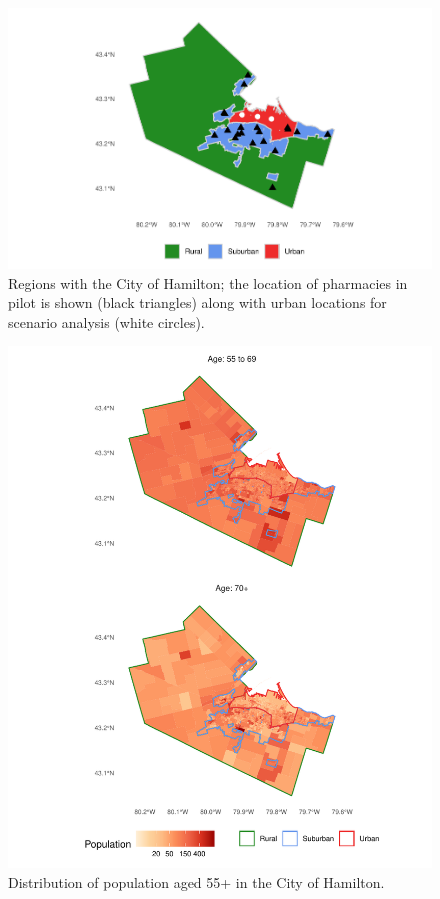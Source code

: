 \documentclass[]{elsarticle} %
\begin{document}
\begin{figure}

{\centering \includegraphics{Accessibility-Vaccination-Sites-Hamilton_files/figure-latex/pharmacies-map-1} 

}

\caption{\label{fig:pharmacies-and-regions}Regions with the City of Hamilton; the location of pharmacies in pilot is shown (black triangles) along with urban locations for scenario analysis (white circles).}\label{fig:pharmacies-map}
\end{figure}

\begin{figure}

{\centering \includegraphics{Accessibility-Vaccination-Sites-Hamilton_files/figure-latex/population-map-1} 

}

\caption{\label{fig:population-map}Distribution of population aged 55+ in the City of Hamilton.}\label{fig:population-map}
\end{figure}
\end{document}
